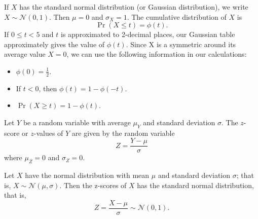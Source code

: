 \documentclass{ximera}
\begin{document}
\hspace{1cm}
\begin{definition} If $X$ has the standard normal distribution (or Gaussian distribution), we write $X\sim \mathcal N(0,1)$. Then $\mu=0$ and $\sigma_X=1$. The cumulative distribution of $X$ is 
$$\Pr(X\leq t)=\phi(t).$$
If $0\leq t <5$ and $t$ is approximated to 2-decimal places, our Gaussian table approximately gives the value of $\phi(t)$. Since X is a symmetric around its average value $X=0$, we can use the following information in our calculations:

\begin{itemize}
    \item $\phi(0)=\frac{1}{2}$.
    \item If $t<0$, then $\phi(t)=1-\phi(-t)$.
    \item $\Pr(X\geq t)=1-\phi(t)$.
\end{itemize}
\end{definition}

\begin{definition}
Let $Y$ be a random variable with average $\mu_Y$ and standard deviation $\sigma$. The $z$-score or $z$-values of $Y$ are given by the random variable $$Z=\frac{Y-\mu}{\sigma}$$
where $\mu_Z=0$ and $\sigma_Z=0$.
\end{definition}

\begin{theorem}
Let $X$ have the normal distribution with mean $\mu$ and standard deviation $\sigma$; that is, $X\sim \mathcal N(\mu,\sigma)$. Then the z-scores of $X$ has the standard normal distribution, that is, $$Z=\frac{X-\mu}{\sigma}\sim \mathcal N(0,1).$$ 
\end{theorem}
\end{document}
